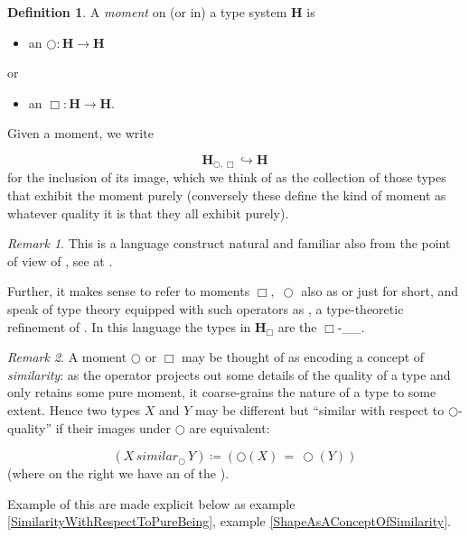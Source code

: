 \documentclass[12pt,titlepage]{article}
\theoremstyle{plain}
\theoremstyle{definition}
\newtheorem{defn}{Definition}
\theoremstyle{remark}
\newtheorem{remark}{Remark}
\begin{document}
\begin{defn}
\label{Moments}\hypertarget{Moments}{}
A \emph{moment} on (or in) a type system $\mathbf{H}$ is

\begin{itemize}%
\item an  $\bigcirc \colon \mathbf{H} \to \mathbf{H}$

\end{itemize}
or

\begin{itemize}%
\item an  $\Box \colon \mathbf{H} \to \mathbf{H}$.

\end{itemize}
Given a moment, we write

\begin{displaymath}
\mathbf{H}_{\bigcirc, \Box} \hookrightarrow \mathbf{H}
\end{displaymath}
for the inclusion of its image, which we think of as the collection of those types that exhibit the moment purely (conversely these define the kind of moment as whatever quality it is that they all exhibit purely).

\end{defn}
\begin{remark}
\label{}\hypertarget{}{}
This is a language construct natural and familiar also from the point of view of , see at .

Further, it makes sense to refer to moments $\Box,\;\bigcirc$ also as  or just  for short, and speak of type theory equipped with such operators as , a type-theoretic refinement of . In this language the types in $\mathbf{H}_{\Box}$ are the $\Box$-\_\_.

\end{remark}
\begin{remark}
\label{MomentsAndSimilarity}\hypertarget{MomentsAndSimilarity}{}
A moment $\bigcirc$ or $\Box$ may be thought of as encoding a concept of \emph{similarity}: as the operator projects out some details of the quality of a type and only retains some pure moment, it coarse-grains the nature of a type to some extent. Hence two types $X$ and $Y$ may be different but ``similar with respect to $\bigcirc$-quality'' if their images under $\bigcirc$ are equivalent:

\begin{displaymath}
(X \,similar_{\bigcirc}\, Y)
  \coloneqq
  (\bigcirc(X) \,= \, \bigcirc(Y))
\end{displaymath}
(where on the right we have an  of the ).

\end{remark}
Example of this are made explicit below as example \ref{SimilarityWithRespectToPureBeing}, example \ref{ShapeAsAConceptOfSimilarity}.
\end{document}

